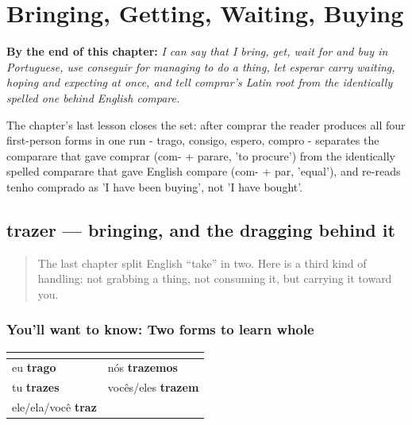 
\chapter{Bringing, Getting, Waiting, Buying}
\label{ch:pt-bringing-getting-waiting-buying}

\begin{chapteropening}
\textbf{By the end of this chapter:} \emph{I can say that I bring, get, wait for and buy in Portuguese, use conseguir for managing to do a thing, let esperar carry waiting, hoping and expecting at once, and tell comprar's Latin root from the identically spelled one behind English compare.}

The chapter's last lesson closes the set: after comprar the reader produces all four first-person forms in one run - trago, consigo, espero, compro - separates the comparare that gave comprar (com- + parare, 'to procure') from the identically spelled comparare that gave English compare (com- + par, 'equal'), and re-reads tenho comprado as 'I have been buying', not 'I have bought'.
\end{chapteropening}

\section[trazer]{trazer — bringing, and the dragging behind it}

\label{lesson:PT-C21-trazer}



\begin{quote}
The last chapter split English \textquotedblleft{}take\textquotedblright{} in two. Here is a third kind of handling: not grabbing a thing, not consuming it, but carrying it toward you.
\end{quote}

\subsection*{You'll want to know: Two forms to learn whole}
\noindent
\begin{tabularx}{\linewidth}{@{}>{\raggedright\arraybackslash}X>{\raggedright\arraybackslash}X@{}}
\toprule
\textbf{} & \textbf{} \\
\midrule
eu \textbf{trago} & nós \textbf{trazemos} \\
tu \textbf{trazes} & vocês/eles \textbf{trazem} \\
ele/ela/você \textbf{traz} &  \\
\bottomrule
\end{tabularx}


